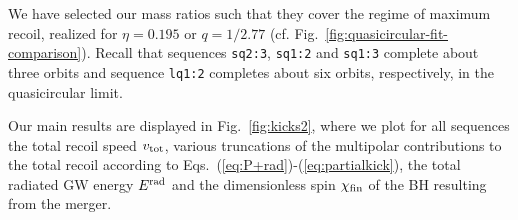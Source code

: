 \documentclass[floats,floatfix,showpacs,amssymb,prd,twocolumn,superscriptaddress,nofootinbib,nolongbibliography,reprint]{revtex4-2}
\newcommand{\mr}[1]{{\textcolor{cyan}{\sf{[MR: #1]}} }}
\begin{document}
%
We have selected our mass ratios such that they cover the
regime of maximum recoil, realized for $\eta=0.195$ or
$q=1/2.77$ (cf. Fig.~\ref{fig:quasicircular-fit-comparison}).
Recall that sequences \texttt{sq2:3}, \texttt{sq1:2} and \texttt{sq1:3}
complete about three orbits and sequence \texttt{lq1:2} completes
about six orbits, respectively, in the quasicircular limit.

Our main results are displayed in Fig.~\ref{fig:kicks2}, where we plot
for all sequences the total recoil speed $v_{\rm tot}$, various
truncations of the multipolar contributions to the total recoil
according to Eqs.~(\ref{eq:P+rad})-(\ref{eq:partialkick}), the
total radiated GW energy $E^{\rm rad}$ and the dimensionless spin
$\chi_{\rm fin}$ of the BH resulting from the merger.
\end{document}
